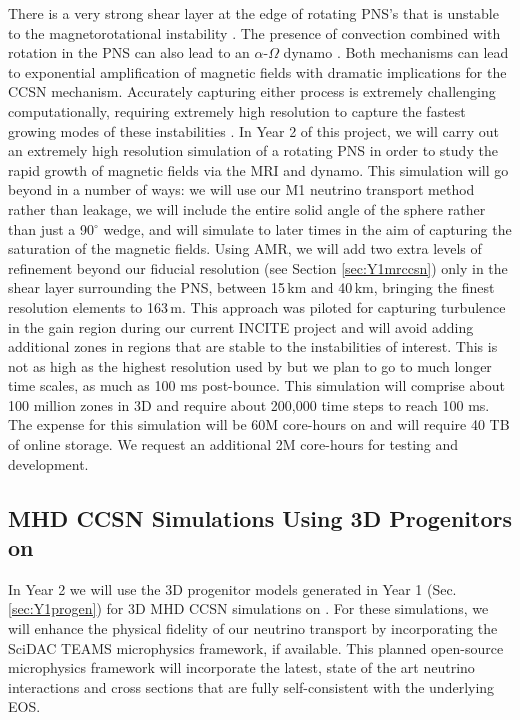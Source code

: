 There is a very strong shear layer at the edge of rotating PNS's that is unstable to the magnetorotational instability \citep[MRI,][]{Akiyama:2003, Burrows:2007}.
The presence of convection combined with rotation in the PNS can also lead to an $\alpha$-$\Omega$ dynamo \citep{Mosta:2015}.
Both mechanisms can lead to exponential amplification of magnetic fields with dramatic implications for the CCSN mechanism.
Accurately capturing either process is extremely challenging computationally, requiring extremely high resolution to capture the fastest growing modes of these instabilities \citep{Mosta:2015}.
In Year 2 of this project, we will carry out an extremely high resolution simulation of a rotating PNS in order to study the rapid growth of magnetic fields via the MRI and dynamo.
This simulation will go beyond \citet{Mosta:2015} in a number of ways: we will use our M1 neutrino transport method rather than leakage, we will include the entire solid angle of the sphere rather than just a 90$^\circ$ wedge, and will simulate to later times in the aim of capturing the saturation of the magnetic fields.
Using AMR, we will add two extra levels of refinement beyond our fiducial resolution (see Section \ref{sec:Y1mrccsn}) only in the shear layer surrounding the PNS, between 15\,km and 40\,km, bringing the finest resolution elements to 163\,m. 
This approach was piloted for capturing turbulence in the gain region during our current INCITE project and will avoid adding additional zones in regions that are stable to the instabilities of interest.
This is not as high as the highest resolution used by \citet{Mosta:2015} but we plan to go to much longer time scales, as much as 100 ms post-bounce.
This simulation will comprise about 100 million zones in 3D and require about 200,000 time steps to reach 100 ms.
The expense for this simulation will be 60M core-hours on \mira and will require 40 TB of online storage. We request an additional 2M core-hours for testing and development.

\subsection{MHD CCSN Simulations Using 3D Progenitors on \thet}

In Year 2 we will use the 3D progenitor models generated in Year 1 (Sec. \ref{sec:Y1progen}) for 3D MHD CCSN simulations on \thet.
For these simulations, we will enhance the physical fidelity of our neutrino transport by incorporating the SciDAC TEAMS microphysics framework, if available.
This planned open-source microphysics framework will incorporate the latest, state of the art neutrino interactions and cross sections that are fully self-consistent with the underlying EOS.

